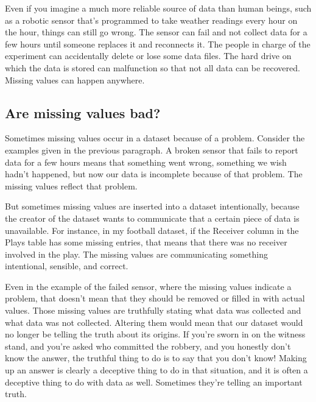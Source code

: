 \documentclass[letterpaper,10pt,english]{sphinxmanual}
\begin{document}
Even if you imagine a much more reliable source of data than human beings, such as a robotic sensor that’s programmed to take weather readings every hour on the hour, things can still go wrong.  The sensor can fail and not collect data for a few hours until someone replaces it and reconnects it.  The people in charge of the experiment can accidentally delete or lose some data files.  The hard drive on which the data is stored can malfunction so that not all data can be recovered.  Missing values can happen anywhere.


\subsection{Are missing values bad?}
\label{\detokenize{chapter-13-etl:are-missing-values-bad}}
Sometimes missing values occur in a dataset because of a problem.  Consider the examples given in the previous paragraph.  A broken sensor that fails to report data for a few hours means that something went wrong, something we wish hadn’t happened, but now our data is incomplete because of that problem.  The missing values reflect that problem.

But sometimes missing values are inserted into a dataset intentionally, because the creator of the dataset wants to communicate that a certain piece of data is unavailable.  For instance, in my football dataset, if the Receiver column in the Plays table has some missing entries, that means that there was no receiver involved in the play.  The missing values are communicating something intentional, sensible, and correct.  

Even in the example of the failed sensor, where the missing values indicate a problem, that doesn’t mean that they should be removed or filled in with actual values.  Those missing values are truthfully stating what data was collected and what data was not collected.  Altering them would mean that our dataset would no longer be telling the truth about its origins.  If you’re sworn in on the witness stand, and you’re asked who committed the robbery, and you honestly don’t know the answer, the truthful thing to do is to say that you don’t know!  Making up an answer is clearly a deceptive thing to do in that situation, and it is often a deceptive thing to do with data as well.    Sometimes they’re telling an important truth.
\end{document}
